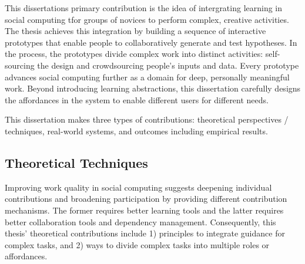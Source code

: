 This dissertation\textquotesingle s primary contribution is the idea of intergrating learning in social computing tfor groups of novices to perform complex, creative activities. The thesis achieves this integration by building a sequence of interactive prototypes that enable people to collaboratively generate and test hypotheses. In the process, the prototypes divide complex work into distinct activities: self-sourcing the design and crowdsourcing people's inputs and data. Every prototype advances social computing further as a domain for deep, personally meaningful work. Beyond introducing learning abstractions, this dissertation carefully designs the affordances in the system to enable different users for different needs. 

This dissertation makes three types of contributions: theoretical perspectives / techniques, real-world systems, and outcomes including empirical results.

\subsection{Theoretical  Techniques}
Improving  work quality in social computing suggests deepening individual contributions and broadening participation by providing different contribution mechanisms. The former requires better learning tools and the latter requires better collaboration tools and dependency management. Consequently, this thesis' theoretical contributions include 1) principles to integrate guidance for complex tasks, and 2) ways to divide complex tasks into multiple roles or affordances.


